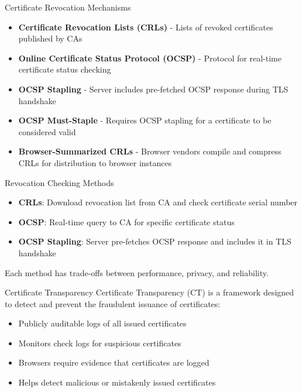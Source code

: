 \begin{theorem}{Certificate Revocation Mechanisms}
\begin{itemize}
    \item \textbf{Certificate Revocation Lists (CRLs)} - Lists of revoked certificates published by CAs
    \item \textbf{Online Certificate Status Protocol (OCSP)} - Protocol for real-time certificate status checking
    \item \textbf{OCSP Stapling} - Server includes pre-fetched OCSP response during TLS handshake
    \item \textbf{OCSP Must-Staple} - Requires OCSP stapling for a certificate to be considered valid
    \item \textbf{Browser-Summarized CRLs} - Browser vendors compile and compress CRLs for distribution to browser instances
\end{itemize}
\end{theorem}

\begin{concept}{Revocation Checking Methods}
\begin{itemize}
    \item \textbf{CRLs}: Download revocation list from CA and check certificate serial number
    \item \textbf{OCSP}: Real-time query to CA for specific certificate status
    \item \textbf{OCSP Stapling}: Server pre-fetches OCSP response and includes it in TLS handshake
\end{itemize}
Each method has trade-offs between performance, privacy, and reliability.
\end{concept}





\begin{definition}{Certificate Transparency}
Certificate Transparency (CT) is a framework designed to detect and prevent the fraudulent issuance of certificates:
\begin{itemize}
    \item Publicly auditable logs of all issued certificates
    \item Monitors check logs for suspicious certificates
    \item Browsers require evidence that certificates are logged
    \item Helps detect malicious or mistakenly issued certificates
\end{itemize}
\end{definition}

\multend




